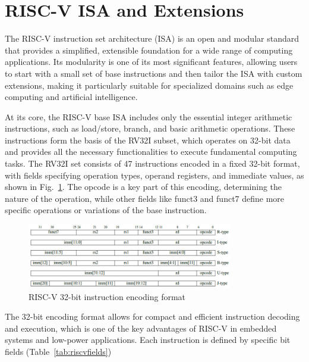 \section{RISC-V ISA and Extensions}

The RISC-V instruction set architecture (ISA) is an open and modular standard that provides a simplified, extensible foundation for a wide range of computing applications. Its modularity is one of its most significant features, allowing users to start with a small set of base instructions and then tailor the ISA with custom extensions, making it particularly suitable for specialized domains such as edge computing and artificial intelligence.

At its core, the RISC-V base ISA includes only the essential integer arithmetic instructions, such as load/store, branch, and basic arithmetic operations. These instructions form the basis of the RV32I subset, which operates on 32-bit data and provides all the necessary functionalities to execute fundamental computing tasks. The RV32I set consists of 47 instructions encoded in a fixed 32-bit format, with fields specifying operation types, operand registers, and immediate values, as shown in Fig.~\ref{fig:riscvisa}. The opcode is a key part of this encoding, determining the nature of the operation, while other fields like funct3 and funct7 define more specific operations or variations of the base instruction.

\begin{figure}[ht]
    \centering
    \includegraphics[width=0.8\textwidth]{figures/riscvisa.png}
    \caption{RISC-V 32-bit instruction encoding format \cite{RISCVISA}}
    \label{fig:riscvisa}
\end{figure}

The 32-bit encoding format allows for compact and efficient instruction decoding and execution, which is one of the key advantages of RISC-V in embedded systems and low-power applications. Each instruction is defined by specific bit fields (Table~\ref{tab:riscvfields}) \cite{RISCVISA}

